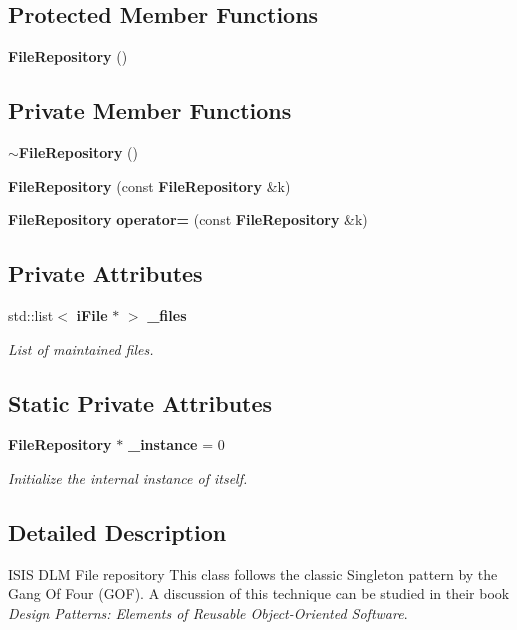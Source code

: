 \subsection*{Protected Member Functions}
\begin{CompactItemize}
\item 
{\bf File\-Repository} ()
\end{CompactItemize}
\subsection*{Private Member Functions}
\begin{CompactItemize}
\item 
{\bf $\sim$File\-Repository} ()
\item 
{\bf File\-Repository} (const {\bf File\-Repository} \&k)
\item 
{\bf File\-Repository} {\bf operator=} (const {\bf File\-Repository} \&k)
\end{CompactItemize}
\subsection*{Private Attributes}
\begin{CompactItemize}
\item 
std::list$<$ {\bf i\-File} $\ast$ $>$ {\bf \_\-files}
\begin{CompactList}\small\item\em List of maintained files. \item\end{CompactList}\end{CompactItemize}
\subsection*{Static Private Attributes}
\begin{CompactItemize}
\item 
{\bf File\-Repository} $\ast$ {\bf \_\-instance} = 0
\begin{CompactList}\small\item\em Initialize the internal instance of itself. \item\end{CompactList}\end{CompactItemize}


\subsection{Detailed Description}
ISIS DLM File repository This class follows the classic Singleton pattern by the Gang Of Four (GOF). A discussion of this technique can be studied in their book {\em Design Patterns: Elements of Reusable Object-Oriented Software\/}.


